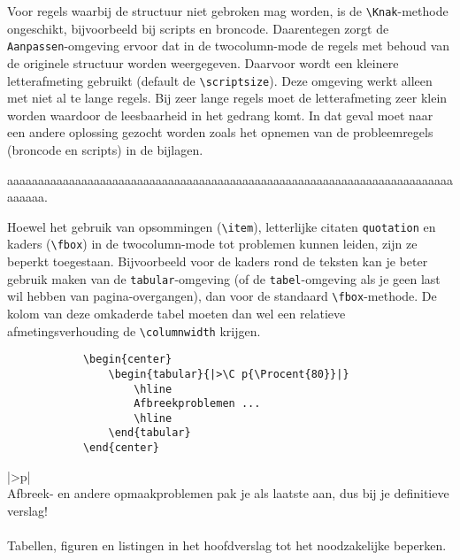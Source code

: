	Voor regels waarbij de structuur niet gebroken mag worden, is de
	\verb!\Knak!-methode ongeschikt, bijvoorbeeld bij scripts en
	broncode. Daarentegen zorgt de \verb!Aanpassen!-omgeving ervoor dat in
	de twocolumn-mode de regels met behoud van de originele structuur
	worden weergegeven. Daarvoor wordt een kleinere letterafmeting
	gebruikt (default de \verb!\scriptsize!). Deze omgeving werkt alleen
	met niet al te lange regels. Bij zeer lange regels moet de
	letterafmeting zeer klein worden waardoor de leesbaarheid in het
	gedrang komt. In dat geval moet naar een andere oplossing gezocht
	worden zoals het opnemen van de probleemregels (broncode en scripts)
	in de bijlagen.
	
	\begin{Aanpassen}[\tiny]
		aaaaaaaaaaaaaaaaaaaaaaaaaaaaaaaaaaaaaaaaaaaaaaaaaaaaaaaaaaaaaaaaaaaaaaaaaaaaaa.
	\end{Aanpassen}
	
	Hoewel het gebruik van opsommingen (\verb!\item!), letterlijke citaten
	\verb!quotation! en kaders (\verb!\fbox!) in de twocolumn-mode tot
	problemen kunnen leiden, zijn ze beperkt toegestaan. Bijvoorbeeld voor
	de kaders rond de teksten kan je beter gebruik maken van de
	\verb!tabular!-omgeving (of de \verb!tabel!-omgeving als je geen last
	wil hebben van pagina-overgangen), dan voor de standaard
	\verb!\fbox!-methode. De kolom van deze omkaderde tabel moeten dan wel
	een relatieve afmetingsverhouding de \verb!\columnwidth! krijgen.
	
	\begin{Aanpassen}
		\begin{verbatim}
			\begin{center}
				\begin{tabular}{|>\C p{\Procent{80}}|}
					\hline
					Afbreekproblemen ...
					\hline
				\end{tabular}
			\end{center}
		\end{verbatim}
	\end{Aanpassen}
	
	\begin{center}
		\begin{tabular}{|>\C p{}|}
			\hline
			~\\
			Afbreek- en andere opmaakproblemen pak je als laatste aan,
			dus bij je definitieve verslag!\\
			~\\
			Tabellen, figuren en listingen in het hoofdverslag tot het
			noodzakelijke beperken.\\
			~\\
			\hline
		\end{tabular}
	\end{center}
	
